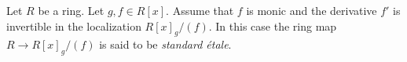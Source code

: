 \begin{definition}
\label{definition-standard-etale}
Let $R$ be a ring. Let $g , f  \in R[x]$.
Assume that $f$ is monic and the derivative $f'$ is invertible in
the localization $R[x]_g/(f)$.
In this case the ring map $R \to R[x]_g/(f)$ is said to be
{\it standard \'etale}.
\end{definition}